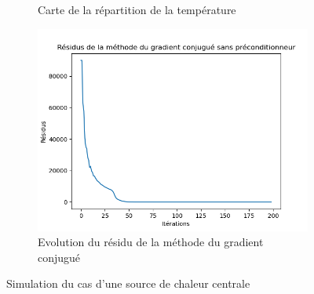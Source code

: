 \documentclass{article}
\begin{document}
\begin{figure}[ht]
\begin{subfigure}{0.25\textwidth}
    \caption{Carte de la répartition de la température}
    \label{subfig:central_source_temp}
  \end{subfigure}
  \hfill
  \begin{subfigure}{0.25\textwidth}
    \centering
    \includegraphics[width=\linewidth]{Chaleur_1c.png}
    \caption{Evolution du résidu de la méthode du gradient conjugué}
    \label{subfig:central_source_residus}
  \end{subfigure}
  \caption{Simulation du cas d'une source de chaleur centrale}
  \label{fig:central_source}
\end{figure}
\end{document}
